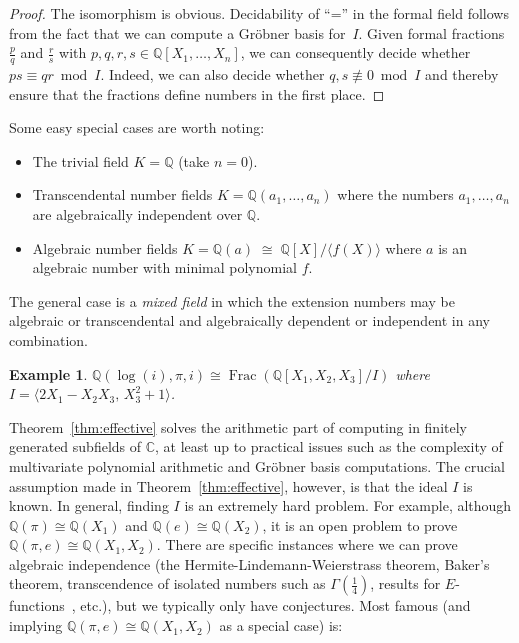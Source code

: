 \documentclass[sigconf,screen,urlbreakonhyphens]{acmart}
\newtheorem{example}{Example}
\begin{document}
\begin{proof}
The isomorphism is obvious.
Decidability of ``='' in the formal
field follows from the fact that we can compute a Gr\"{o}bner basis for~$I$.
Given
formal fractions $\tfrac{p}{q}$ and $\tfrac{r}{s}$ with
$p,q,r,s \in \mathbb{Q}[X_1,\ldots,X_n]$,
we can consequently decide whether $ps \equiv qr \bmod I$.
Indeed, we can also decide whether $q, s \not \equiv 0 \bmod I$ and thereby ensure that
the fractions define numbers in the first place.
\end{proof}

Some easy special cases are worth noting:

\begin{itemize}
\item The trivial field $K = \mathbb{Q}$ (take $n = 0$).
\item Transcendental number fields
$K = \mathbb{Q}(a_1,\ldots,a_n)$
where the numbers $a_1,\ldots,a_n$ are
algebraically independent over $\mathbb{Q}$.
\item Algebraic number fields $K = \mathbb{Q}(a) \; \cong \; \mathbb{Q}[X] / \langle f(X)\rangle$
where $a$ is an algebraic number with minimal polynomial $f$.
\end{itemize}

The general case is a \emph{mixed field} in which the extension
numbers may be algebraic or transcendental and algebraically
dependent or independent in any combination.

\begin{example}
$\mathbb{Q}(\log(i),\pi,i) \cong \operatorname{Frac}(\mathbb{Q}[X_1,X_2,X_3] / I)$
where $I = \langle 2 X_1 - X_2 X_3, \, X_3^2+1 \rangle$.
\end{example}

Theorem~\ref{thm:effective} solves the arithmetic part of computing in
finitely generated
subfields of $\mathbb{C}$, at least up to practical issues such as the complexity
of multivariate polynomial arithmetic and Gr\"{o}bner basis computations.
The crucial assumption made in Theorem~\ref{thm:effective}, however, is that
the ideal $I$ is known.
In general, finding $I$ is an extremely hard problem.
For example, although $\mathbb{Q}(\pi) \cong \mathbb{Q}(X_1)$
and $\mathbb{Q}(e) \cong \mathbb{Q}(X_2)$, it is an open
problem to prove $\mathbb{Q}(\pi,e) \cong \mathbb{Q}(X_1,X_2)$.
There are specific instances where we can prove algebraic
independence (the Hermite-Lindemann-Weierstrass theorem,
Baker's theorem, transcendence of isolated
numbers such as $\Gamma(\tfrac{1}{4})$, results
for $E$-functions~\cite{FR2019}, etc.), but we typically only
have conjectures. Most famous (and implying
$\mathbb{Q}(\pi,e) \cong \mathbb{Q}(X_1,X_2)$ as a special case) is:
\end{document}
